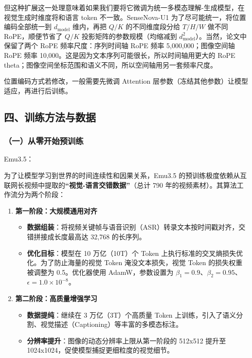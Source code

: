 但这种扩展这一处理意味着如果我们要将它微调为统一多模态理解-生成模型，在视觉生成时维度将和语言 token 不一致。SenseNova-U1 为了尽可能统一，将位置编码全部统一到 \(d_{\mathrm{model}}\) 维内，再把 \(Q/K\) 的不同维度段分给 \(T/H/W\) 做不同 RoPE，顺便节省了 \(Q/K\) 投影矩阵的参数规模（均缩减到 \(d_{\mathrm{model}}^2\)）。当然，论文中保留了两个 RoPE 频率尺度：序列时间轴 RoPE 频率 5,000,000；图像空间轴 RoPE 频率 10,000。这是因为文本序列可能很长，所以时间轴用更大的 RoPE theta；图像空间坐标范围和语义不同，所以空间轴用另一套频率尺度。

位置编码方式若修改，一般需要先微调 Attention 层参数（冻结其他参数）让模型适应，再进行后训练。

\hypertarget{ux56dbux8badux7ec3ux65b9ux6cd5ux4e0eux6570ux636e}{%
\subsection{四、训练方法与数据}\label{ux56dbux8badux7ec3ux65b9ux6cd5ux4e0eux6570ux636e}}

\hypertarget{ux4e00ux4eceux96f6ux5f00ux59cbux9884ux8badux7ec3}{%
\subsubsection{（一）从零开始预训练}\label{ux4e00ux4eceux96f6ux5f00ux59cbux9884ux8badux7ec3}}

Emu3.5：

为了让模型学习到世界的时间连续性和因果关系，Emu3.5 的预训练极度依赖从互联网长视频中提取的\textbf{``视觉-语言交错数据''}（总计 790 年的视频素材）。其算法工作流分为两个阶段：

\begin{enumerate}
\def\labelenumi{\arabic{enumi}.}
\tightlist
\item
  \textbf{第一阶段：大规模通用对齐}

  \begin{itemize}
  \tightlist
  \item
    \textbf{数据组装}：将视频关键帧与语音识别（ASR）转录文本按时间戳对齐，交错拼接成长度最高达 32,768 的长序列。
  \item
    \textbf{优化目标}：模型在 10 万亿（10T）个 Token 上执行标准的交叉熵损失优化。为了防止海量的视觉 Token 淹没文本损失，视觉 Token 的损失权重被调整为 0.5。优化器使用 AdamW，参数设置为 \(\beta_1=0.9\)、\(\beta_2=0.95\)、\(\epsilon=1.0\times10^{-8}\)。
  \end{itemize}
\item
  \textbf{第二阶段：高质量增强学习}

  \begin{itemize}
  \tightlist
  \item
    \textbf{数据提纯}：继续在 3 万亿（3T）个高质量 Token 上训练，引入了语义分割、视觉描述（Captioning）等丰富的多模态标注。
  \item
    \textbf{分辨率提升}：图像的动态分辨率上限从第一阶段的 512x512 提升至 1024x1024，促使模型捕捉更细粒度的视觉细节。
  \end{itemize}
\end{enumerate}

